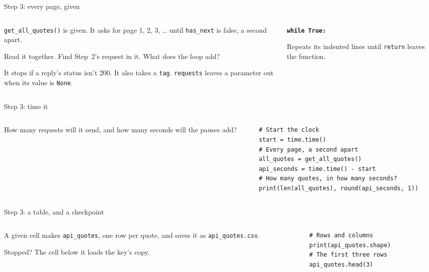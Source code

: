 \documentclass[9pt,aspectratio=169]{beamer}
\begin{document}
\begin{frame}{Step 3: every page, given}
    \begin{columns}[T]
        \begin{column}{0.6\textwidth}
            \texttt{get\_all\_quotes()} is given. It asks for page 1, 2, 3, \ldots{} until \texttt{has\_next} is false, a second apart.

            \medskip
            Read it together. Find Step~2's request in it. What does the loop add?

            \medskip
            It stops if a reply's status isn't 200. It also takes a \texttt{tag}. \texttt{requests} leaves a parameter out when its value is \texttt{None}.
        \end{column}
        \begin{column}{0.35\textwidth}
            \textbf{\texttt{while True:}}\\[2pt]
            {\footnotesize Repeats its indented lines until \texttt{return} leaves the function.\par}
        \end{column}
    \end{columns}
\end{frame}

\begin{frame}[fragile]{Step 3: time it}
    \begin{columns}[T]
        \begin{column}{0.37\textwidth}
            How many requests will it send, and how many seconds will the pauses add?
        \end{column}
        \begin{column}{0.6\textwidth}
\begin{lstlisting}[style=lab]
# Start the clock
start = time.time()
# Every page, a second apart
all_quotes = get_all_quotes()
api_seconds = time.time() - start
# How many quotes, in how many seconds?
print(len(all_quotes), round(api_seconds, 1))
\end{lstlisting}
        \end{column}
    \end{columns}
\end{frame}

\begin{frame}[fragile]{Step 3: a table, and a checkpoint}
    \begin{columns}[T]
        \begin{column}{0.37\textwidth}
            A given cell makes \texttt{api\_quotes}, one row per quote, and saves it as \texttt{api\_quotes.csv}.

            \medskip
            Stopped? The cell below it loads the key's copy.
        \end{column}
        \begin{column}{0.6\textwidth}
\begin{lstlisting}[style=lab]
# Rows and columns
print(api_quotes.shape)
# The first three rows
api_quotes.head(3)
\end{lstlisting}
        \end{column}
    \end{columns}
\end{frame}
\end{document}
